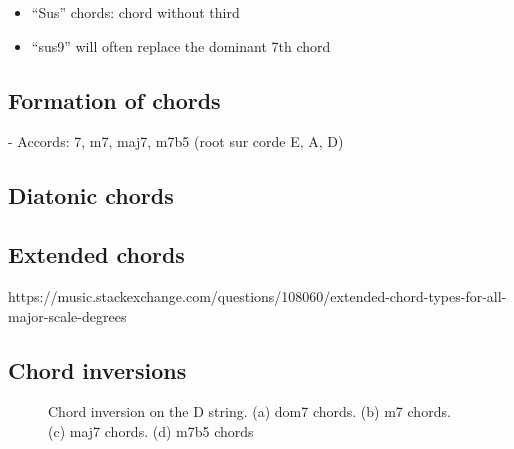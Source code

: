 \documentclass{article}
\begin{document}
\begin{itemize}
	\item ``Sus'' chords: chord without third
	\item ``sus9'' will often replace the dominant 7th chord
\end{itemize}

\clearpage
\subsection{Formation of chords}



- Accords: 7, m7, maj7, m7b5 (root sur corde E, A, D)


\clearpage
\subsection{Diatonic chords}




\subsection{Extended chords}

https://music.stackexchange.com/questions/108060/extended-chord-types-for-all-major-scale-degrees

\clearpage
\subsection{Chord inversions}

\begin{figure}[h!]
	\centering
	\hspace*{-2.2cm}
	\scalebox{0.7}{}
	\hspace*{-2.2cm}
	\scalebox{0.7}{}
	\hspace*{-2.2cm}
	\scalebox{0.7}{}
	\hspace*{-2.2cm}
	\scalebox{0.7}{}
	\caption{Chord inversion on the D string. (a) dom7 chords. (b) m7 chords. (c) maj7 chords. (d) m7b5 chords }
	\label{fig}
\end{figure}
\end{document}
